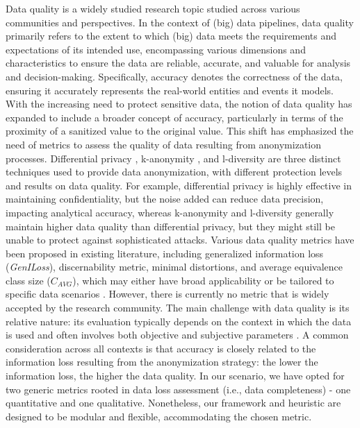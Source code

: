 Data quality is a widely studied research topic studied across various communities and perspectives. In the context of (big) data pipelines, data quality primarily refers to the extent to which (big) data meets the requirements and expectations of its intended use, encompassing various dimensions and characteristics to ensure the data are reliable, accurate, and valuable for analysis and decision-making. Specifically, accuracy denotes the correctness of the data, ensuring it accurately represents the real-world entities and events it models.
{\color{OurColor}
With the increasing need to protect sensitive data, the notion of data quality has expanded to include a broader concept of accuracy, particularly in terms of the proximity of a sanitized value to the original value.
This shift has emphasized the need of metrics to assess the quality of data resulting from anonymization processes.
Differential privacy \cite{dwork2008differential}, k-anonymity \cite{k-anon}, and l-diversity \cite{l-diversity} are three distinct techniques used to provide data anonymization, with different protection levels and results on data quality. For example, differential privacy is highly effective in maintaining confidentiality, but the noise added can reduce data precision, impacting analytical accuracy, whereas k-anonymity and l-diversity generally maintain higher data quality than differential privacy, but they might still be unable to protect against sophisticated attacks.
}
Various data quality metrics have been proposed in existing literature, including generalized information loss (\textit{GenILoss}), discernability metric, minimal distortions, and average equivalence class size ($C_{AVG}$), which may either have broad applicability or be tailored to specific data scenarios \cite{Majeed2021AnonymizationTF,bookMetrics,reviewMetrics}. However, there is currently no metric that is widely accepted by the research community. The main challenge with data quality is its relative nature: its evaluation typically depends on the context in which the data is used and often involves both objective and subjective parameters \cite{dataAccuracy,dataQuality}.
%
A common consideration across all contexts is that accuracy is closely related to the information loss resulting from the anonymization strategy: the lower the information loss, the higher the data quality. In our scenario, we have opted for two generic metrics rooted in data loss assessment (i.e., data completeness) - one quantitative and one qualitative. Nonetheless, our framework and heuristic are designed to be modular and flexible, accommodating the chosen metric.

